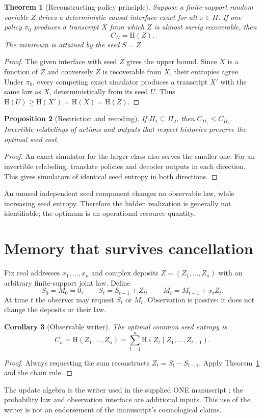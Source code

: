 \documentclass[11pt]{article}
\newtheorem{theorem}{Theorem}[section]
\newtheorem{proposition}[theorem]{Proposition}
\newtheorem{corollary}[theorem]{Corollary}
\theoremstyle{remark}\newtheorem{remark}[theorem]{Remark}
\newcommand{\HH}{\mathrm H}
\begin{document}
\begin{theorem}[Reconstructing-policy principle]\label{thm:reconstruct}
Suppose a finite-support random variable $Z$ drives a deterministic causal
interface exact for all $\pi\in\Pi$. If one policy $\pi_0$ produces a transcript
$X$ from which $Z$ is almost surely recoverable, then
\[
 \boxed{C_\Pi=\HH(Z).}
\]
The minimum is attained by the seed $S=Z$.
\end{theorem}
\begin{proof}
The given interface with seed $Z$ gives the upper bound. Since $X$ is a function
of $Z$ and conversely $Z$ is recoverable from $X$, their entropies agree.
Under $\pi_0$, every competing exact simulator produces a transcript $X'$ with
the same law as $X$, deterministically from its seed $U$. Thus
$\HH(U)\ge\HH(X')=\HH(X)=\HH(Z)$.
\end{proof}

\begin{proposition}[Restriction and recoding]
If $\Pi_1\subseteq\Pi_2$, then $C_{\Pi_1}\le C_{\Pi_2}$.
Invertible relabelings of actions and outputs that respect histories preserve
the optimal seed cost.
\end{proposition}
\begin{proof}
An exact simulator for the larger class also serves the smaller one.
For an invertible relabeling, translate policies and decoder outputs in each
direction. This gives simulators of identical seed entropy in both directions.
\end{proof}
An unused independent seed component changes no observable law, while increasing
seed entropy. Therefore the hidden realization is generally not identifiable;
the optimum is an operational resource quantity.

\section{Memory that survives cancellation}
Fix real addresses $x_1,\ldots,x_n$ and complex deposits
$Z=(Z_1,\ldots,Z_n)$ with an arbitrary finite-support joint law. Define
\[
 S_0=M_0=0,\qquad S_t=S_{t-1}+Z_t,\qquad
 M_t=M_{t-1}+x_tZ_t.
\]
At time $t$ the observer may request $S_t$ or $M_t$. Observation is passive:
it does not change the deposits or their law.

\begin{corollary}[Observable writer]
The optimal common seed entropy is
\[
 C_n=\HH(Z_1,\ldots,Z_n)
 =\sum_{t=1}^n\HH(Z_t\mid Z_1,\ldots,Z_{t-1}).
\]
\end{corollary}
\begin{proof}
Always requesting the sum reconstructs $Z_t=S_t-S_{t-1}$. Apply
Theorem~\ref{thm:reconstruct} and the chain rule.
\end{proof}
The update algebra is the writer used in the supplied ONE manuscript
\cite{one}; the probability law and observation interface are additional inputs.
This use of the writer is not an endorsement of the manuscript's cosmological
claims.
\end{document}
